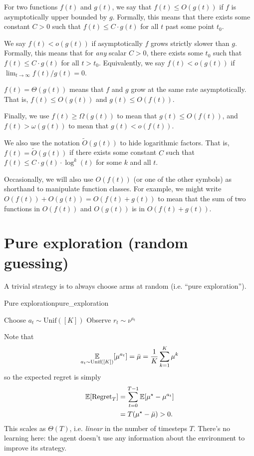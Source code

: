 \documentclass[\main/main]{subfiles}
\begin{document}
For two functions $f(t)$ and $g(t)$, we say that $f(t) \le O(g(t))$ if $f$ is asymptotically upper bounded by $g$. Formally, this means that there exists some constant $C > 0$ such that $f(t) \le C \cdot g(t)$ for all $t$ past some point $t_0$.

We say $f(t) < o(g(t))$ if asymptotically $f$ grows strictly slower than $g$. Formally, this means that for \emph{any} scalar $C > 0$, there exists some $t_0$ such that $f(t) \le C \cdot g(t)$ for all $t > t_0$. Equivalently, we say $f(t) < o(g(t))$ if $\lim_{t \to \infty} f(t)/g(t) = 0$.

$f(t) = \Theta(g(t))$ means that $f$ and $g$ grow at the same rate asymptotically. That is, $f(t) \le O(g(t))$ and $g(t) \le O(f(t))$.

Finally, we use $f(t) \ge \Omega(g(t))$ to mean that $g(t) \le O(f(t))$, and $f(t) > \omega(g(t))$ to mean that $g(t) < o(f(t))$.

We also use the notation $\tilde O(g(t))$ to hide logarithmic factors. That is, $f(t) = \tilde O(g(t))$ if there exists some constant $C$ such that $f(t) \le C \cdot g(t) \cdot \log^k(t)$ for some $k$ and all $t$.

Occasionally, we will also use $O(f(t))$ (or one of the other symbols) as shorthand to manipulate function classes. For example, we might write $O(f(t)) + O(g(t)) = O(f(t) + g(t))$ to mean that the sum of two functions in $O(f(t))$ and $O(g(t))$ is in $O(f(t) + g(t))$.

\section{Pure exploration (random guessing)}

A trivial strategy is to always choose arms at random (i.e. ``pure exploration'').
\begin{definition}{Pure exploration}{pure_exploration}
    \begin{algorithmic}
        \State Choose $a_t \sim \text{Unif}([K])$
        \State Observe $r_t \sim \nu^{a_t}$
        \EndFor
    \end{algorithmic}
\end{definition}
Note that \[
    \operatorname*{\mathbb{E}}_{a_t \sim \text{Unif}([K])}[\mu^{a_t}] = \bar \mu = \frac{1}{K} \sum_{k=1}^K \mu^k
\] so the expected regret is simply
\begin{align*}
    \operatorname*{\mathbb{E}}[\text{Regret}_T] & = \sum_{t=0}^{T-1} \operatorname*{\mathbb{E}}[\mu^\star - \mu^{a_t}] \\
                        & = T (\mu^\star - \bar \mu) > 0.
\end{align*}
This scales as $\Theta(T)$, i.e. \emph{linear} in the number of timesteps $T$. There's no learning here: the agent doesn't use any information about the environment to improve its strategy.
\end{document}
